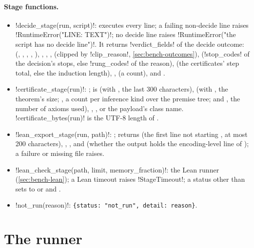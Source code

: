 \paragraph{Stage functions.}
\begin{itemize}
\item \py!decide_stage(run, script)!: executes every line; a failing non-decide line raises
  \py!RuntimeError("LINE: TEXT")!; no decide line raises \py!RuntimeError("the script has no decide line")!. It returns \py!verdict_fields! of the decide outcome: 
  (, , , ,
  ), , , ,  (clipped by
  \py!clip_reason!, \cref{sec:bench-outcomes}),  (\py!stop_codes! of the decision's stops, else \py!rung_codes!
  of the reason),  (the certificates' step total, else the induction
  length), ,  (a count), and .
\item \py!certificate_stage(run)!: ;  is 
  (with , the last 300 characters),  (with , the
  theorem's size; , a count per inference kind over the premise tree; and
  , the number of axioms used), , , or the payload's
  class name. \py!certificate_bytes(run)! is the UTF-8 length of .
\item \py!lean_export_stage(run, path)!: ; returns
   (the first  line not starting , at most
  200 characters), , , and 
  (whether the output holds the encoding-level line of ); a failure
  or missing file raises.
\item \py!lean_check_stage(path, limit, memory_fraction)!: the Lean runner
  (\cref{sec:bench-lean}); a Lean timeout raises \py!StageTimeout!; a status other than
   sets  to  or  and .
\item \py!not_run(reason)!: \texttt{\{status: "not\_run", detail: reason\}}.
\end{itemize}

\section{The runner}\label{sec:bench-runner}


